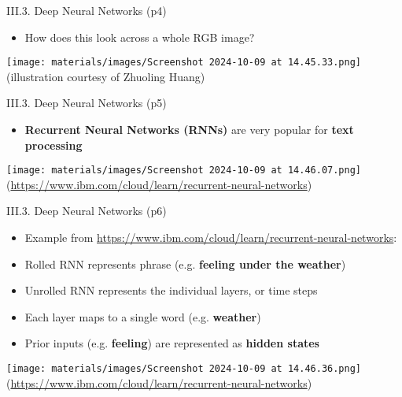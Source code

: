 \documentclass[handout]{beamer}
\newcommand{\strong}[1]{\textbf{\color{teal} #1}}
\newcommand{\stronger}[1]{\textbf{\color{purple} #1}}
\begin{document}
\begin{frame}{III.3. Deep Neural Networks (p4)}
\begin{itemize}
\item How does this look across a whole RGB image?
\end{itemize}
\begin{center}
\texttt{[image: materials/images/Screenshot 2024-10-09 at 14.45.33.png]}\\
{\footnotesize (illustration courtesy of Zhuoling Huang)}
\end{center}
\end{frame}
\begin{frame}{III.3. Deep Neural Networks (p5)}
\begin{itemize}
\item \stronger{Recurrent Neural Networks (RNNs)} are very popular for \strong{text processing}
\end{itemize}
\begin{center}
\texttt{[image: materials/images/Screenshot 2024-10-09 at 14.46.07.png]}\\
{\footnotesize (\url{https://www.ibm.com/cloud/learn/recurrent-neural-networks})}
\end{center}
\end{frame}
\begin{frame}{III.3. Deep Neural Networks (p6)}
\begin{itemize}
\item Example from {\footnotesize \url{https://www.ibm.com/cloud/learn/recurrent-neural-networks}}:
\item Rolled RNN represents phrase {\small (e.g. \textbf{feeling under the weather})}
\item Unrolled RNN represents the individual layers, or time steps
\item Each layer maps to a single word (e.g. \textbf{weather})
\item Prior inputs (e.g. \textbf{feeling}) are represented as \strong{hidden states}
\end{itemize}
\begin{center}
\texttt{[image: materials/images/Screenshot 2024-10-09 at 14.46.36.png]}\\
{\footnotesize (\url{https://www.ibm.com/cloud/learn/recurrent-neural-networks})}
\end{center}
\end{frame}
\end{document}

